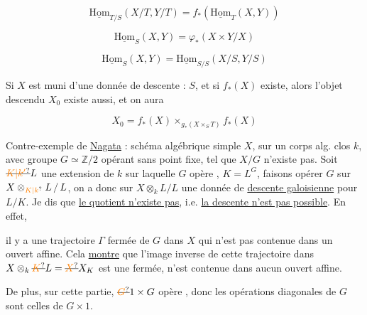 \[
\underline{\mathrm{Hom}}_{T/S}(X/T,Y/T)=f_*(\underline{\mathrm{Hom}}_T(X,Y))
\]

\[
\underline{\mathrm{Hom}}_S(X,Y)=\varphi_*(X\times Y/X)
\]

\[
\underline{\mathrm{Hom}}_S(X,Y)=\underline{\mathrm{Hom}}_{S/S}(X/S,Y/S)
\]

Si $X$ est muni d'une donnée de descente : $S$, et si $f_*(X)$ existe, alors l'objet descendu $X_0$ existe aussi, et on aura

\[
X_0=f_*(X)\times_{g_*(X\times_S T)}f_*(X)
\]

Contre-exemple de \uline{Nagata} : schéma algébrique simple  $X$, sur un corps alg. clos $k$, avec groupe $G\simeq\mathbb{Z}/2$ opérant sans point fixe, tel que $X/G$ n'existe pas. Soit $\deleted{\unsure{K|k'}}L$ une extension de $k$ sur laquelle $G$ opère  ,  $K=L^G$, faisons opérer $G$ \uline{} sur $X\otimes_{\unsure{K|k}}L\,/\,L$, on a donc sur $X\otimes_k L/L$ une donnée de \uline{descente galoisienne} pour $L/K$. Je dis que \uline{le quotient n'existe pas}, i.e. \uline{la descente n'est pas possible}. En effet, 

\deleted{\[
(X\otimes_kL)\otimes_K\unsure{L|\overline L}=X\otimes_k(L\otimes_KL)=X\otimes_kL
\]}


il y a  une trajectoire $\Gamma$ fermée de $G$ dans $X$ qui n'est pas contenue dans un ouvert affine. Cela  \uline{montre} que l'image inverse de cette trajectoire dans $X\otimes_k\deleted{\unsure{K}}L=\deleted{\unsure{X}}X_{K}$ est  une  fermée,  n'est contenue dans aucun ouvert affine. 


De plus, sur cette partie, $\deleted{\unsure{G}}1\times G$ opère , donc les opérations  diagonales de $G$ sont celles de $G\times1$.

